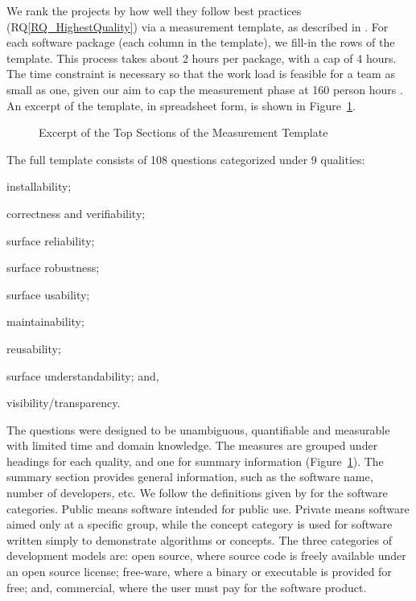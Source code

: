 \documentclass[runningheads]{llncs}
\newcommand{\rqref}[1]{RQ\ref{#1}}
\begin{document}
We rank the projects by how well they follow best practices
(\rqref{RQ_HighestQuality}) via a measurement template, as described in
\cite{SmithEtAl2021}.  For each software package (each column in the template),
we fill-in the rows of the template. This process takes about 2 hours per
package, with a cap of 4 hours. The time constraint is necessary so that the
work load is feasible for a team as small as one, given our aim to cap the
measurement phase at 160 person hours \cite{SmithEtAl2021}.  An excerpt of the
template, in spreadsheet form, is shown in
Figure~\ref{measurement_template_image}.

\begin{figure}[!ht]
	\begin{center}
	  \caption{Excerpt of the Top Sections of the Measurement Template}
	  \label{measurement_template_image}
	\end{center}
\end{figure}

The full template consists of 108 questions categorized under 9 qualities:
\begin{inparaenum}[(i)]
	\item installability;
	\item correctness and verifiability;
	\item surface reliability;
	\item surface robustness;
	\item surface usability;
	\item maintainability;
	\item reusability;
	\item surface understandability; and,
	\item visibility/transparency. 
\end{inparaenum} 

The questions were designed to be unambiguous, quantifiable and measurable with
limited time and domain knowledge. The measures are grouped under headings for
each quality, and one for summary information
(Figure~\ref{measurement_template_image}).   The summary section provides
general information, such as the software name, number of developers, etc.  We
follow the definitions given by \cite{gewaltig2012quality} for the software
categories.  Public means software intended for public use.  Private means
software aimed only at a specific group, while the concept category is used for
software written simply to demonstrate algorithms or concepts. The three
categories of development models are: open source, where source code is freely
available under an open source license; free-ware, where a binary or executable
is provided for free; and, commercial, where the user must pay for the software
product.  
\end{document}
